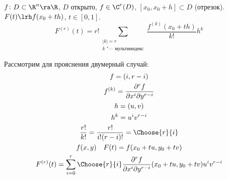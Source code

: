 \begin{lemma}
	$f\colon D \subset \R^n \ra \R$, $D$ открыто, $f \in \C^r(D)$, $[x_0, x_0 + h] \subset D$ (отрезок).
	$F(t) \lrh f(x_0 + th)$, $t \in [0,1]$.
	\[ F^{(r)}(t) = r! \sum_{\substack{|k| = r \\ \text{$k$ "--- мультииндекс}}} \frac{f^{(k)}(x_0 + th)}{k!} h^k \]
\end{lemma}
\begin{Rem}
	Рассмотрим для прояснения двумерный случай:
	\begin{gather*}
		f = (i, r - i) \\
		f^{(k)} = \frac{\partial^r f}{\partial x^i \partial y^{r-i}} \\
		h = (u, v) \\
		h^k = u^i v^{r-i} \\
		\frac{r!}{k!} = \frac{r!}{i! (r-i)!} = \Choose{r}{i} \\
		f(x, y) \quad F(t) = f(x_0 + tu, y_0 + tv) \\
		F^{(r)} (t) = \sum_{i = 0}^r \Choose{r}{i} \frac{\partial^r f}{\partial x^i \partial y^{r-i}} (x_0 + tu, y_0 + tv) u^i v^{r-i}
	\end{gather*}
\end{Rem}
